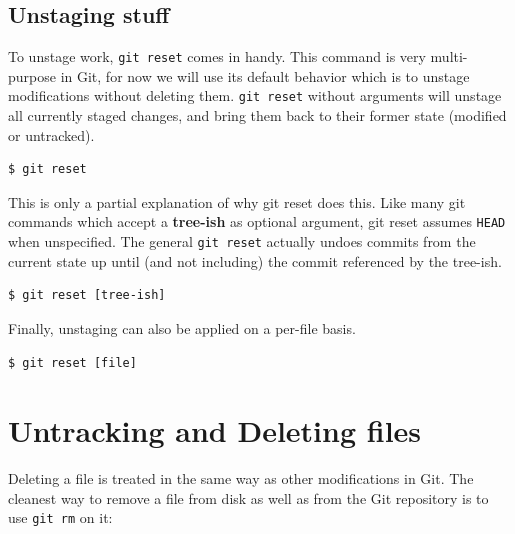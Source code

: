 \documentclass{tufte-handout}
\begin{document}
\subsection{Unstaging stuff}

To unstage work, \texttt{git reset} comes in handy.
This command is very multi-purpose in Git, for now we will use its default behavior which is to unstage modifications without deleting them.
\texttt{git reset} without arguments will unstage all currently staged changes, and bring them back to their former state (modified or untracked).


\begin{lstlisting}[style=BashInputStyle]
  $ git reset 
\end{lstlisting}

This is only a partial explanation of why git reset does this.
Like many git commands which accept a \textbf{tree-ish} as optional argument, git reset assumes \texttt{HEAD} when unspecified.
The general \texttt{git reset} actually undoes commits from the current state up until (and not including) the commit referenced by the tree-ish.

\begin{lstlisting}[style=BashInputStyle]
  $ git reset [tree-ish]
\end{lstlisting}

Finally, unstaging can also be applied on a per-file basis.

\begin{lstlisting}[style=BashInputStyle]
  $ git reset [file]
\end{lstlisting}

\section{Untracking and Deleting files}

Deleting a file is treated in the same way as other modifications in Git.
The cleanest way to remove a file from disk as well as from the Git repository is to use \texttt{git rm} on it:
\end{document}
